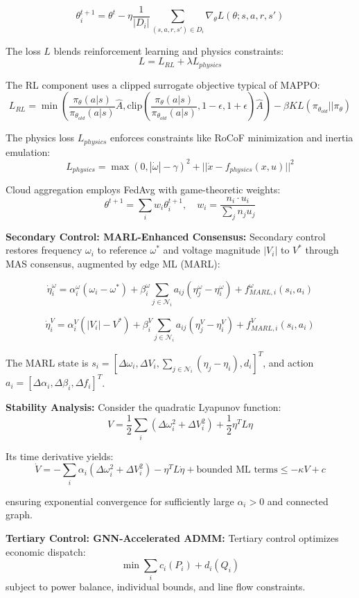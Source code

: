 \documentclass[12pt]{article}
\begin{document}
$$\theta_i^{t+1} = \theta^t - \eta \frac{1}{|D_i|} \sum_{(s,a,r,s') \in D_i} \nabla_{\theta} L(\theta; s, a, r, s')$$

The loss $L$ blends reinforcement learning and physics constraints:
$$L = L_{RL} + \lambda L_{physics}$$

The RL component uses a clipped surrogate objective typical of MAPPO:
$$L_{RL} = \min \left( \frac{\pi_{\theta}(a|s)}{\pi_{\theta_{old}}(a|s)} \hat{A}, \text{clip}\left(\frac{\pi_{\theta}(a|s)}{\pi_{\theta_{old}}(a|s)}, 1-\epsilon, 1+\epsilon\right) \hat{A} \right) - \beta KL(\pi_{\theta_{old}} || \pi_{\theta})$$

The physics loss $L_{physics}$ enforces constraints like RoCoF minimization and inertia emulation:
$$L_{physics} = \max(0, |\dot{\omega}| - \gamma)^2 + ||\dot{x} - f_{physics}(x, u)||^2$$

Cloud aggregation employs FedAvg with game-theoretic weights:
$$\theta^{t+1} = \sum_i w_i \theta_i^{t+1}, \quad w_i = \frac{n_i \cdot u_i}{\sum_j n_j u_j}$$

\textbf{Secondary Control: MARL-Enhanced Consensus:} Secondary control restores frequency $\omega_i$ to reference $\omega^*$ and voltage magnitude $|V_i|$ to $V^*$ through MAS consensus, augmented by edge ML (MARL):

$$\dot{\eta}_i^{\omega} = \alpha_i^{\omega}(\omega_i - \omega^*) + \beta_i^{\omega} \sum_{j \in \mathcal{N}_i} a_{ij}(\eta_j^{\omega} - \eta_i^{\omega}) + f_{MARL,i}^{\omega}(s_i, a_i)$$

$$\dot{\eta}_i^{V} = \alpha_i^{V}(|V_i| - V^*) + \beta_i^{V} \sum_{j \in \mathcal{N}_i} a_{ij}(\eta_j^{V} - \eta_i^{V}) + f_{MARL,i}^{V}(s_i, a_i)$$

The MARL state is $s_i = [\Delta\omega_i, \Delta V_i, \sum_{j \in \mathcal{N}_i}(\eta_j - \eta_i), d_i]^T$, and action $a_i = [\Delta\alpha_i, \Delta\beta_i, \Delta f_i]^T$.

\textbf{Stability Analysis:} Consider the quadratic Lyapunov function:
$$V = \frac{1}{2}\sum_i (\Delta\omega_i^2 + \Delta V_i^2) + \frac{1}{2}\eta^T L \eta$$

Its time derivative yields:
$$\dot{V} = -\sum_i \alpha_i(\Delta\omega_i^2 + \Delta V_i^2) - \eta^T L \dot{\eta} + \text{bounded ML terms} \leq -\kappa V + c$$

ensuring exponential convergence for sufficiently large $\alpha_i > 0$ and connected graph.

\textbf{Tertiary Control: GNN-Accelerated ADMM:} Tertiary control optimizes economic dispatch:
$$\min \sum_i c_i(P_i) + d_i(Q_i)$$
subject to power balance, individual bounds, and line flow constraints.
\end{document}
